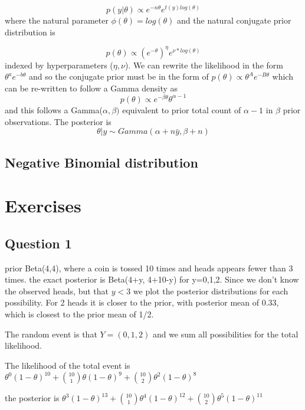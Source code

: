 \documentclass[
]{book}
\theoremstyle{definition}
\theoremstyle{definition}
\theoremstyle{definition}
\theoremstyle{definition}
\theoremstyle{remark}
\begin{document}
\[
p(y|\theta)\propto e^{-n\theta}e^{t(y)log(\theta)}
\]
where the natural parameter \(\phi(\theta)=log(\theta)\) and the natural conjugate prior distribution is

\[
p(\theta)\propto (e^{-\theta})^{\eta}e^{\nu *log(\theta)}
\]
indexed by hyperparameters (\(\eta,\nu\)). We can rewrite the likelihood in the form \(\theta^a e^{-b\theta}\) and so the conjugate prior must be in the form of \(p(\theta)\propto \theta^Ae^{-B\theta}\) which can be re-written to follow a Gamma density as
\[
p(\theta)\propto e^{-\beta\theta}\theta^{\alpha-1}
\]
and this follows a Gamma(\(\alpha,\beta)\) equivalent to prior total count of \(\alpha-1\) in \(\beta\) prior observations. The posterior is
\[
\theta|y \sim Gamma(\alpha+n\bar{y}, \beta+n)
\]

\hypertarget{negative-binomial-distribution}{%
\subsection*{Negative Binomial distribution}\label{negative-binomial-distribution}}

\hypertarget{exercises-1}{%
\section{Exercises}\label{exercises-1}}

\hypertarget{question-1}{%
\subsection*{Question 1}\label{question-1}}

prior Beta(4,4), where a coin is tossed 10 times and heads appears fewer than 3 times. the exact posterior is Beta(4+y, 4+10-y) for y=0,1,2. Since we don't know the observed heads, but that \(y<3\) we plot the posterior distributions for each possibility. For 2 heads it is closer to the prior, with posterior mean of 0.33, which is closest to the prior mean of 1/2.

The random event is that \(Y=(0,1,2)\) and we sum all possibilities for the total likelihood.

The likelihood of the total event is \(\theta^0(1-\theta)^{10}+\binom{10}{1}\theta(1-\theta)^9+\binom{10}{2}\theta^2(1-\theta)^8\)

the posterior is \(\theta^3(1-\theta)^{13}+\binom{10}{1}\theta^4(1-\theta)^{12}+\binom{10}{2}\theta^5(1-\theta)^{11}\)
\end{document}
